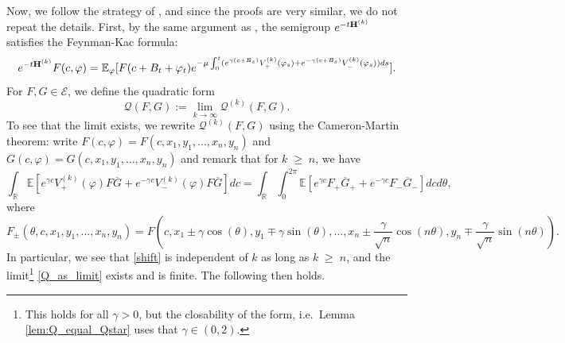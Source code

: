 \documentclass[11pt]{amsart}
\numberwithin{equation}{section}
\theoremstyle{definition}
\renewcommand{\geq}{\;\geqslant\;}                   %
\newcommand{\R}{\mathbb{R}}
\def\E{\mathbb{E}}
\newcommand{\bbar}{\overline}
\newcommand{\mc}{\mathcal}
\begin{document}
Now, we follow the strategy of \cite[Section 5.2]{GKRV}, and since the proofs are very similar, we do not repeat the details.
First, by the same argument as \cite[Proposition 5.3]{GKRV}, the semigroup $e^{-t{\bf H}^{(k)}}$ satisfies the Feynman-Kac formula:
\begin{equation}\label{FK_Hk}
 e^{-t{\bf H}^{(k)}}F(c,\varphi)=\E_{\varphi}[ F(c+B_t+\varphi_t)e^{-\mu\int_0^t (e^{\gamma (c+B_s)}V_+^{(k)}(\varphi_s)+e^{-\gamma (c+B_s)}V_-^{(k)}(\varphi_s))ds}].
 \end{equation}
For $F,G\in \mc{E}$, we define the quadratic form 
\begin{equation}\label{Q_as_limit}
\mc{Q}(F,G):=\lim_{k\to \infty}\mc{Q}^{(k)}(F,G).
\end{equation}
To see that the limit exists, we rewrite $\mc{Q}^{(k)}(F,G)$ using the Cameron-Martin theorem: write 
$F(c,\varphi)=F(c,x_1,y_1,\dots,x_n,y_n)$ and $G(c,\varphi)=G(c,x_1,y_1,\dots,x_n,y_n)$ and remark that for $k\geq n$, we have 
\begin{equation}\label{shift}
 \int_{\R} \E[ e^{\gamma c}V_+^{(k)}(\varphi)F\bbar{G}+e^{-\gamma c}V_-^{(k)}(\varphi)F\bbar{G}]dc =\int_{\R}\int_0^{2\pi} 
\E[ e^{\gamma c}F_{+}\bbar{G}_++e^{-\gamma c}F_{-}\bbar{G}_- ]dc d\theta, 
\end{equation}
where 
\[ F_{\pm}(\theta,c,x_1,y_1,\dots,x_n,y_n)=F(c,x_1\pm \gamma\cos(\theta),y_1\mp \gamma\sin(\theta),\dots,x_n\pm \frac{\gamma}{\sqrt{n}}\cos(n\theta),y_n\mp \frac{\gamma}{\sqrt{n}}\sin(n\theta)).
\]
In particular, we see that \eqref{shift} is independent of $k$ as long as $k\geq n$, and the limit\footnote{This holds for all $\gamma > 0$, but the closability of the form, i.e.\ Lemma \ref{lem:Q_equal_Qstar} uses that $\gamma \in (0,2)$.} \eqref{Q_as_limit} exists and is finite. 
The following then holds.
\end{document}
